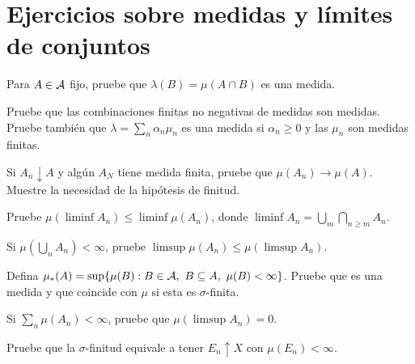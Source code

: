 \section{Ejercicios sobre medidas y límites de conjuntos}
\begin{ejercicio}\label{ej:v2-l02-1}
Para $A\in\mathcal A$ fijo, pruebe que $\lambda(B)=\mu(A\cap B)$ es una medida.
\end{ejercicio}

\begin{ejercicio}\label{ej:v2-l02-2}
Pruebe que las combinaciones finitas no negativas de medidas son medidas. Pruebe también que $\lambda=\sum_n\alpha_n\mu_n$ es una medida si $\alpha_n\ge0$ y las $\mu_n$ son medidas finitas.
\end{ejercicio}

\begin{ejercicio}\label{ej:v2-l02-3}
Si $A_n\downarrow A$ y algún $A_N$ tiene medida finita, pruebe que $\mu(A_n)\to\mu(A)$. Muestre la necesidad de la hipótesis de finitud.
\end{ejercicio}

\begin{ejercicio}\label{ej:v2-l02-4}
Pruebe $\mu(\liminf A_n)\le\liminf\mu(A_n)$, donde $\liminf A_n=\bigcup_m\bigcap_{n\ge m}A_n$.
\end{ejercicio}

\begin{ejercicio}\label{ej:v2-l02-5}
Si $\mu(\bigcup_nA_n)<\infty$, pruebe $\limsup\mu(A_n)\le\mu(\limsup A_n)$.
\end{ejercicio}

\begin{ejercicio}\label{ej:v2-l02-6}
Defina $\mu_*(A)=\sup\{\mu(B):B\in\Acal,\ B\subseteq A,\ \mu(B)<\infty\}$. Pruebe que es una medida y que coincide con $\mu$ si esta es $\sigma$-finita.
\end{ejercicio}

\begin{ejercicio}\label{ej:v2-l02-7}
Si $\sum_n\mu(A_n)<\infty$, pruebe que $\mu(\limsup A_n)=0$.
\end{ejercicio}

\begin{ejercicio}\label{ej:v2-l02-8}
Pruebe que la $\sigma$-finitud equivale a tener $E_n\uparrow X$ con $\mu(E_n)<\infty$.
\end{ejercicio}
